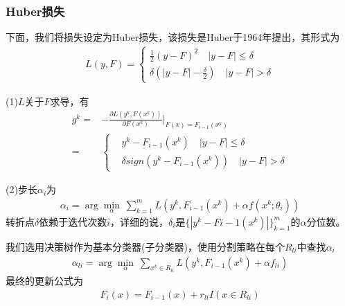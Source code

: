           \subsubsection{Huber损失}
              \par
              下面，我们将损失设定为Huber损失，该损失是Huber于1964年提出，其形式为
              \begin{align*}
              L(y,F) = \left\{
              \begin{aligned}
              \frac{1}{2}(y-F)^2\quad |y-F| \leqslant \delta\\
              \delta (|y-F|-\frac{\delta}{2}) \quad |y-F| > \delta
              \end{aligned}
              \right.
              \end{align*}
              \par
              (1)$L$关于$F$求导，有
              \begin{align*}
              g^k =& -\frac{\partial L(y^k,F(x^k))}{\partial F(x^k)} \bigg|_{F(x) = F_{i-1}(x^k)}\\
              =& \left\{
              \begin{aligned}
              & y^k - F_{i-1}(x^k) \quad |y-F| \leqslant \delta\\
              & \delta sign (y^k - F_{i-1}(x^k)) \quad |y-F| >\delta
              \end{aligned}
              \right.
              \end{align*}
              \par
              (2)步长$\alpha_i$为
              \begin{align*}
              \alpha_i = \arg\min_\alpha \ \sum_{k=1}^m L(y^k,F_{i-1}(x^k)+\alpha f(x^k;\theta_i))
              \end{align*}
              转折点$\delta$依赖于迭代次数$i$，详细的说，$\delta_i$是$\{|y^k - F{i-1}(x^k)|\}_{k=1}^m$的$\alpha$分位数。
              \par
              我们选用决策树作为基本分类器(子分类器)，使用分割策略在每个$R_{li}$中查找$\alpha_i$
              \begin{align*}
              \alpha_{li} = \arg\min_\alpha \ \sum_{x^k\in R_{li}} L(y^k,F_{i-1}(x^k)+\alpha f_{li})
              \end{align*}
              最终的更新公式为
              \begin{align*}
              F_i(x) = F_{i-1}(x)+r_{li}I(x\in R_{li})
              \end{align*}
